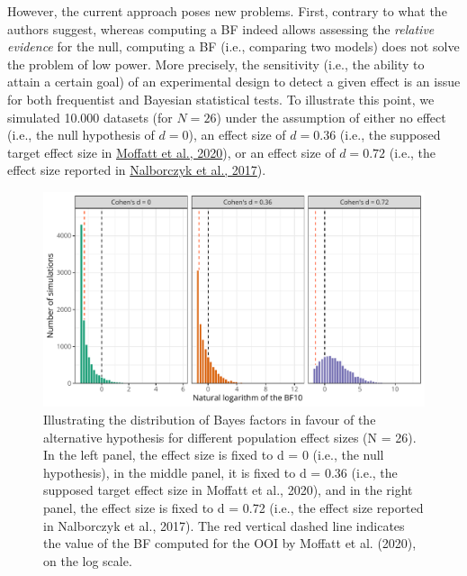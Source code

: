 \documentclass[
  english,
  man, donotrepeattitle,floatsintext]{apa6}
\begin{document}
However, the current approach poses new problems. First, contrary to what the authors suggest, whereas computing a BF indeed allows assessing the \emph{relative evidence} for the null, computing a BF (i.e., comparing two models) does not solve the problem of low power. More precisely, the sensitivity (i.e., the ability to attain a certain goal) of an experimental design to detect a given effect is an issue for both frequentist and Bayesian statistical tests. To illustrate this point, we simulated 10.000 datasets (for \(N = 26\)) under the assumption of either no effect (i.e., the null hypothesis of \(d = 0\)), an effect size of \(d = 0.36\) (i.e., the supposed target effect size in \protect\hyperlink{ref-moffatt_inner_2020}{Moffatt et al., 2020}), or an effect size of \(d = 0.72\) (i.e., the effect size reported in \protect\hyperlink{ref-nalborczyk_orofacial_2017}{Nalborczyk et al., 2017}).

\begin{figure}[!htb]

{\centering \includegraphics[width=1\linewidth]{manuscript_files/figure-latex/bf-dance-1} 

}

\caption{Illustrating the distribution of Bayes factors in favour of the alternative hypothesis for different population effect sizes (N = 26). In the left panel, the effect size is fixed to d = 0 (i.e., the null hypothesis), in the middle panel, it is fixed to d = 0.36 (i.e., the supposed target effect size in Moffatt et al., 2020), and in the right panel, the effect size is fixed to d = 0.72 (i.e., the effect size reported in Nalborczyk et al., 2017). The red vertical dashed line indicates the value of the BF computed for the OOI by Moffatt et al. (2020), on the log scale.}\label{fig:bf-dance}
\end{figure}
\end{document}
